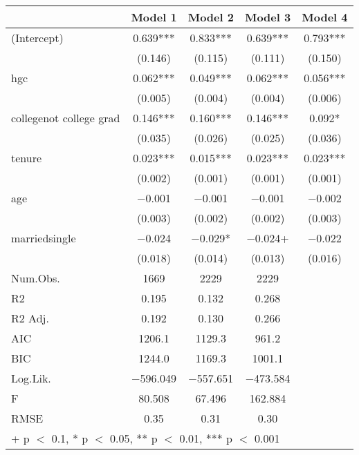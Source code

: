 \documentclass{article}
\begin{document}
\begin{table}
\centering
\begin{tabular}[t]{lcccc}
\toprule
  & Model 1 & Model 2 & Model 3 & Model 4\\
\midrule
(Intercept) & \num{0.639}*** & \num{0.833}*** & \num{0.639}*** & \num{0.793}***\\
 & (\num{0.146}) & (\num{0.115}) & (\num{0.111}) & (\num{0.150})\\
hgc & \num{0.062}*** & \num{0.049}*** & \num{0.062}*** & \num{0.056}***\\
 & (\num{0.005}) & (\num{0.004}) & (\num{0.004}) & (\num{0.006})\\
collegenot college grad & \num{0.146}*** & \num{0.160}*** & \num{0.146}*** & \num{0.092}*\\
 & (\num{0.035}) & (\num{0.026}) & (\num{0.025}) & (\num{0.036})\\
tenure & \num{0.023}*** & \num{0.015}*** & \num{0.023}*** & \num{0.023}***\\
 & (\num{0.002}) & (\num{0.001}) & (\num{0.001}) & (\num{0.001})\\
age & \num{-0.001} & \num{-0.001} & \num{-0.001} & \num{-0.002}\\
 & (\num{0.003}) & (\num{0.002}) & (\num{0.002}) & (\num{0.003})\\
marriedsingle & \num{-0.024} & \num{-0.029}* & \num{-0.024}+ & \num{-0.022}\\
 & (\num{0.018}) & (\num{0.014}) & (\num{0.013}) & (\num{0.016})\\
\midrule
Num.Obs. & \num{1669} & \num{2229} & \num{2229} & \\
R2 & \num{0.195} & \num{0.132} & \num{0.268} & \\
R2 Adj. & \num{0.192} & \num{0.130} & \num{0.266} & \\
AIC & \num{1206.1} & \num{1129.3} & \num{961.2} & \\
BIC & \num{1244.0} & \num{1169.3} & \num{1001.1} & \\
Log.Lik. & \num{-596.049} & \num{-557.651} & \num{-473.584} & \\
F & \num{80.508} & \num{67.496} & \num{162.884} & \\
RMSE & \num{0.35} & \num{0.31} & \num{0.30} & \\
\bottomrule
\multicolumn{5}{l}{\rule{0pt}{1em}+ p $<$ 0.1, * p $<$ 0.05, ** p $<$ 0.01, *** p $<$ 0.001}\\
\end{tabular}
\end{table}
\end{document}
